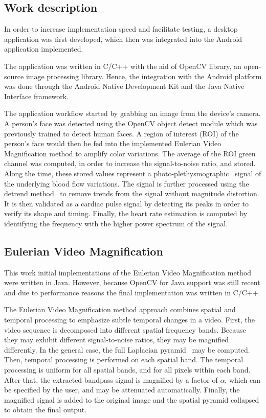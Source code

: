 \documentclass[9pt,a4paper]{extarticle}
\newcommand{\evm}{Eulerian Video Magnification}
\begin{document}
\begin{multicols}{2}
\section{Work description}\label{sec:work}

In order to increase implementation speed and facilitate testing, a
desktop application was first developed, which then was integrated into
the Android application implemented.

The application was written in C/C++ with the aid of OpenCV library, an
open-source image processing library. Hence, the integration with the Android
platform was done through the Android Native Development Kit and the
Java Native Interface framework.

The application workflow started by grabbing an image from the device's
camera. A person's face was detected using the OpenCV object detect module
which was previously trained to detect human faces. A region of interest (ROI)
of the person's face would then be fed into the implemented \evm{} method to
amplify color variations. The average of the ROI green channel was computed,
in order to increase the signal-to-noise ratio, and stored. Along the time,
these stored values represent a
photo-plethysmographic~\cite{Verkruysse2008Remote} signal of the underlying
blood flow variations. The signal is further processed using the detrend
method~\cite{Tarvainen2002Advanced}
to remove trends from the signal without magnitude distortion. It is then
validated as a cardiac pulse signal by detecting its peaks in order to
verify its shape and timing. Finally, the heart rate estimation is
computed by identifying the frequency with the higher power spectrum of
the signal.

\subsection{Eulerian Video Magnification}\label{sec:work:evm}

This work initial implementations of the \evm{} method were written in Java.
However, because OpenCV for Java support was still recent and due to performance
reasons the final implementation was written in C/C++.

The \evm{} method approach combines
spatial and temporal processing to emphasize subtle temporal changes
in a video. First, the video sequence is decomposed into different
spatial frequency bands. Because they may exhibit different
signal-to-noise ratios, they may be magnified differently.
In the general case, the full Laplacian pyramid~\cite{Burt1983Laplacian}
may be computed. Then, temporal processing is performed on each
spatial band. The temporal processing is uniform for all spatial
bands, and for all pixels within each band. After that, the extracted
bandpass signal is magnified by a factor of $\alpha$, which can be
specified by the user, and may be attenuated automatically. Finally,
the magnified signal is added to the original image and the spatial pyramid
collapsed to obtain the final output.


\end{multicols}
\end{document}
